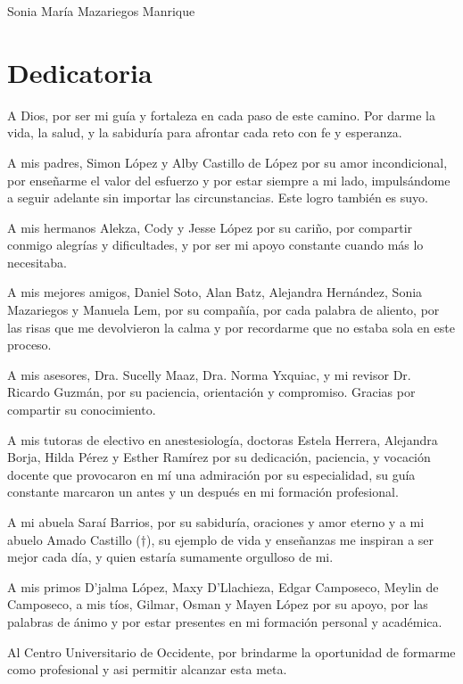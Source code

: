 \documentclass[11pt,letterpaper]{report}
\begin{document}
\vspace{1cm}

\begin{flushright}
Sonia María Mazariegos Manrique
\end{flushright}

\chapter*{Dedicatoria}
A Dios, por ser mi guía y fortaleza en cada paso de este camino. Por darme la
vida, la salud, y la sabiduría para afrontar cada reto con fe y esperanza.

A mis padres, Simon López y Alby Castillo de López por su amor incondicional,
por enseñarme el valor del esfuerzo y por estar siempre a mi lado,
impulsándome a seguir adelante sin importar las circunstancias. Este logro
también es suyo.

A mis hermanos Alekza, Cody y Jesse López por su cariño, por compartir
conmigo alegrías y dificultades, y por ser mi apoyo constante cuando más lo
necesitaba.

A mis mejores amigos, Daniel Soto, Alan Batz, Alejandra Hernández, Sonia
Mazariegos y Manuela Lem, por su compañía, por cada palabra de aliento, por
las risas que me devolvieron la calma y por recordarme que no estaba sola en
este proceso.

A mis asesores, Dra. Sucelly Maaz, Dra. Norma Yxquiac, y mi revisor Dr. Ricardo
Guzmán, por su paciencia, orientación y compromiso. Gracias por compartir su
conocimiento.

A mis tutoras de electivo en anestesiología, doctoras Estela Herrera, Alejandra
Borja, Hilda Pérez y Esther Ramírez por su dedicación, paciencia, y vocación
docente que provocaron en mí una admiración por su especialidad, su guía
constante marcaron un antes y un después en mi formación profesional.

A mi abuela Saraí Barrios, por su sabiduría, oraciones y amor eterno y a mi
abuelo Amado Castillo ($\dagger$), su ejemplo de vida y enseñanzas me inspiran a
ser mejor cada día, y quien estaría sumamente orgulloso de mi.

A mis primos D'jalma López, Maxy D'Llachieza, Edgar Camposeco, Meylin de
Camposeco, a mis tíos, Gilmar, Osman y Mayen López por su apoyo, por las
palabras de ánimo y por estar presentes en mi formación personal y académica.

Al Centro Universitario de Occidente, por brindarme la oportunidad de
formarme como profesional y asi permitir alcanzar esta meta.
\end{document}
